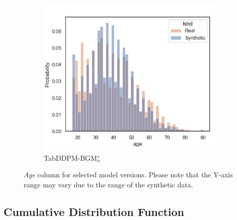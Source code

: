 \begin{figure}[H]
	\begin{subfigure}{0.3\textwidth}
		\centering
		\includegraphics[width=\textwidth]{images/dist_age/tab-ddpm-bgm-simTune-none.jpg}
		\caption{TabDDPM-BGM$^{s}_n$}
	\end{subfigure}
	\caption[Distribution Plots Continuous]{\textit{Age} column for selected model versions. Please note that the Y-axis range may vary due to the range of the synthetic data.}
	\label{fig:age}
\end{figure}
\newpage


\subsection{Cumulative Distribution Function}

